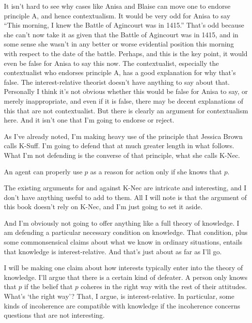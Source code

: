 \documentclass[11pt,]{book}
\providecommand{\tightlist}{%
  \setlength{\itemsep}{0pt}\setlength{\parskip}{0pt}}
\begin{document}
It isn't hard to see why cases like Anisa and Blaise can move one to endorse principle A, and hence contextualism. It would be very odd for Anisa to say ``This morning, I knew the Battle of Agincourt was in 1415.'' That's odd because she can't now take it as given that the Battle of Agincourt was in 1415, and in some sense she wasn't in any better or worse evidential position this morning with respect to the date of the battle. Perhaps, and this is the key point, it would even be false for Anisa to say this now. The contextualist, especially the contextualist who endorses principle A, has a good explanation for why that's false. The interest-relative theorist doesn't have anything to say about that. Personally I think it's not obvious whether this would be false for Anisa to say, or merely inappropriate, and even if it is false, there may be decent explanations of this that are not contextualist. But there is clearly an argument for contextualism here. And it isn't one that I'm going to endorse or reject.

As I've already noted, I'm making heavy use of the principle that Jessica Brown calls K-Suff. I'm going to defend that at much greater length in what follows. What I'm not defending is the converse of that principle, what she calls K-Nec.

\begin{description}
\tightlist
\item[K-Nec]
An agent can properly use \(p\) as a reason for action only if she knows that \(p\).
\end{description}

The existing arguments for and against K-Nec are intricate and interesting, and I don't have anything useful to add to them. All I will note is that the argument of this book doesn't rely on K-Nec, and I'm just going to set it aside.

And I'm obviously not going to offer anything like a full theory of knowledge. I am defending a particular necessary condition on knowledge. That condition, plus some commonsensical claims about what we know in ordinary situations, entails that knowledge is interest-relative. And that's just about as far as I'll go.

I will be making one claim about how interests typically enter into the theory of knowledge. I'll argue that there is a certain kind of defeater. A person only knows that \(p\) if the belief that \(p\) coheres in the right way with the rest of their attitudes. What's `the right way'? That, I argue, is interest-relative. In particular, some kinds of incoherence are compatible with knowledge if the incoherence concerns questions that are not interesting.
\end{document}
